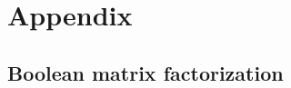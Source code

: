 \documentclass[twoside]{article}
\begin{document}


\newpage
\section{Appendix} \label{sec:appendix}


\subsection{Boolean matrix factorization}








% 




% 
\end{document}
